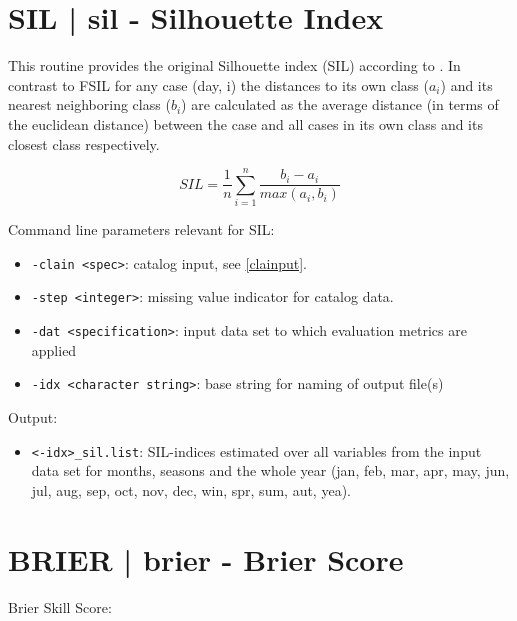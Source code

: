 \documentclass[12pt, oneside, a4paper, headsepline, plainheadsepline]{scrbook}
\begin{document}
\section{SIL | sil - Silhouette Index}

This routine provides the original Silhouette index (SIL) according to \citet{Rousseeuw1987}. In contrast to FSIL for any case (day, i) the distances to its own class ($a_i$) and its nearest neighboring class ($b_i$) are calculated as the average distance (in terms of the euclidean distance) between the case and all cases in its own class and its closest class respectively.

\begin{equation}
SIL = \frac{1}{n}\sum_{i=1}^{n} \frac{b_i - a_i}{max(a_i, b_i)}
\end{equation}

Command line parameters relevant for SIL:
\begin{itemize}
\item  \verb+-clain <spec>+:  catalog input, see \ref{clainput}.
\item  \verb+-step <integer>+: missing value indicator for catalog data.
\item  \verb+-dat <specification>+: input data set to which evaluation metrics are applied
\item  \verb+-idx <character string>+: base string for naming of output file(s)
\end{itemize}
Output:
\begin{itemize}
\item   \verb+<-idx>_sil.list+: SIL-indices estimated over all variables from the input data set for months, seasons and the whole year (jan, feb, mar, apr, may, jun, jul, aug, sep, oct, nov, dec, win, spr, sum, aut, yea).
\end{itemize}


\section{BRIER | brier - Brier Score}

Brier Skill Score:
\end{document}
